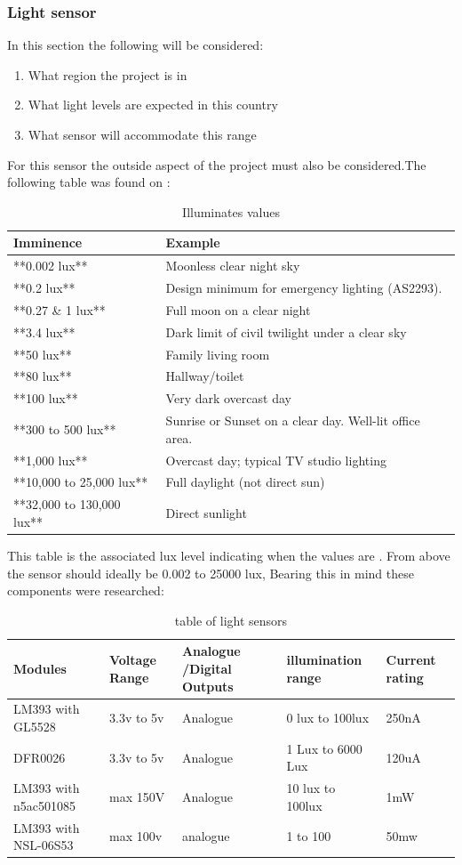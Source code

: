 \subsubsection{Light sensor}
In this section the following will be considered:
\begin{enumerate}
	\item What region the project is in 
	\item What light levels are expected in this  country
	\item What sensor  will  accommodate this  range
\end{enumerate}
\newpage
For this sensor  the outside aspect of the  project must also be considered.The following table was found on \cite{wiki_2023}:
	\begin{table}[h!]
	\centering
	\begin{tabular}{|l|l|}
	\hline
		Imminence & Example \\ \hline
		**0.002 lux** & Moonless clear night sky \\ \hline
		**0.2 lux** & Design minimum for emergency lighting (AS2293). \\ \hline
		**0.27 \& 1 lux** & Full moon on a clear night \\ \hline
		**3.4 lux** & Dark limit of civil twilight under a clear sky \\ \hline
		**50 lux** & Family living room \\ \hline
		**80 lux** & Hallway/toilet \\ \hline
		**100 lux** & Very dark overcast day \\ \hline
		**300 to 500 lux** & Sunrise or Sunset on a clear day. Well-lit office area. \\ \hline
		**1,000 lux** & Overcast day; typical TV studio lighting \\ \hline
		**10,000 to 25,000 lux** & Full daylight (not direct sun) \\ \hline
		**32,000 to 130,000 lux** & Direct sunlight \\ \hline
	\end{tabular}
	\caption{Illuminates values}
	\label{Illuminates values}
\end{table}
	This table is the  associated lux level  indicating when the values are . 
	From  above the sensor should ideally be 0.002 to 25000 lux, Bearing this in mind  these components were researched:
	\begin{table}[h!]
	\small
	\centering
	\begin{tabular}{|l|l|l|l|l|}
	\hline
		Modules & Voltage Range & Analogue /Digital Outputs & illumination range & Current rating \\ 
		\hline
		LM393 with GL5528 & 3.3v to 5v & Analogue & 0 lux to 100lux & 250nA \\ 
		\hline
		DFR0026 & 3.3v to 5v & Analogue & 1 Lux to 6000 Lux & 120uA \\ \hline
		LM393 with n5ac501085 & max 150V & Analogue & 10 lux to 100lux & 1mW \\ 
		\hline
		LM393 with NSL-06S53 & max 100v & analogue & 1 to 100 & 50mw \\ \hline
	\end{tabular}
	\caption{table of light sensors}
	\label{table of light sensors}
\end{table}
